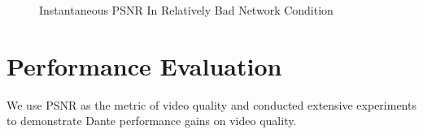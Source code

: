 \begin{figure}[!t]
	\centering
	\vspace{-0.3cm}
	\caption{Instantaneous PSNR In Relatively Bad Network Condition}
	\vspace{-0.4cm}
	\label{fig:apuct}
\end{figure}	




\section{Performance Evaluation}
We use PSNR as the metric of video quality and conducted extensive experiments to demonstrate Dante performance gains on video quality. 

